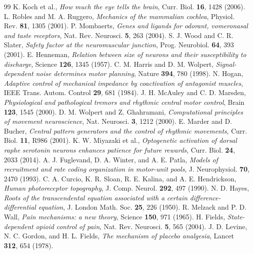 \begin{thebibliography}{99}
 K. Koch et al., \emph{How much the eye tells the brain}, Curr. Biol. \textbf{16}, 1428 (2006).
 L. Robles and M. A. Ruggero, \emph{Mechanics of the mammalian cochlea}, Physiol. Rev. \textbf{81}, 1305 (2001).
 P. Mombaerts, \emph{Genes and ligands for odorant, vomeronasal and taste receptors}, Nat. Rev. Neurosci. \textbf{5}, 263 (2004).
 S. J. Wood and C. R. Slater, \emph{Safety factor at the neuromuscular junction}, Prog. Neurobiol. \textbf{64}, 393 (2001).
 E. Henneman, \emph{Relation between size of neurons and their susceptibility to discharge}, Science \textbf{126}, 1345 (1957).
 C. M. Harris and D. M. Wolpert, \emph{Signal-dependent noise determines motor planning}, Nature \textbf{394}, 780 (1998).
 N. Hogan, \emph{Adaptive control of mechanical impedance by coactivation of antagonist muscles}, IEEE Trans. Autom. Control \textbf{29}, 681 (1984).
 J. H. McAuley and C. D. Marsden, \emph{Physiological and pathological tremors and rhythmic central motor control}, Brain \textbf{123}, 1545 (2000).
 D. M. Wolpert and Z. Ghahramani, \emph{Computational principles of movement neuroscience}, Nat. Neurosci. \textbf{3}, 1212 (2000).
 E. Marder and D. Bucher, \emph{Central pattern generators and the control of rhythmic movements}, Curr. Biol. \textbf{11}, R986 (2001).
 K. W. Miyazaki et al., \emph{Optogenetic activation of dorsal raphe serotonin neurons enhances patience for future rewards}, Curr. Biol. \textbf{24}, 2033 (2014).
 A. J. Fuglevand, D. A. Winter, and A. E. Patla, \emph{Models of recruitment and rate coding organization in motor-unit pools}, J. Neurophysiol. \textbf{70}, 2470 (1993).
 C. A. Curcio, K. R. Sloan, R. E. Kalina, and A. E. Hendrickson, \emph{Human photoreceptor topography}, J. Comp. Neurol. \textbf{292}, 497 (1990).
 N. D. Hayes, \emph{Roots of the transcendental equation associated with a certain difference-differential equation}, J. London Math. Soc. \textbf{25}, 226 (1950).
 R. Melzack and P. D. Wall, \emph{Pain mechanisms: a new theory}, Science \textbf{150}, 971 (1965).
 H. Fields, \emph{State-dependent opioid control of pain}, Nat. Rev. Neurosci. \textbf{5}, 565 (2004).
 J. D. Levine, N. C. Gordon, and H. L. Fields, \emph{The mechanism of placebo analgesia}, Lancet \textbf{312}, 654 (1978).

\end{thebibliography}
